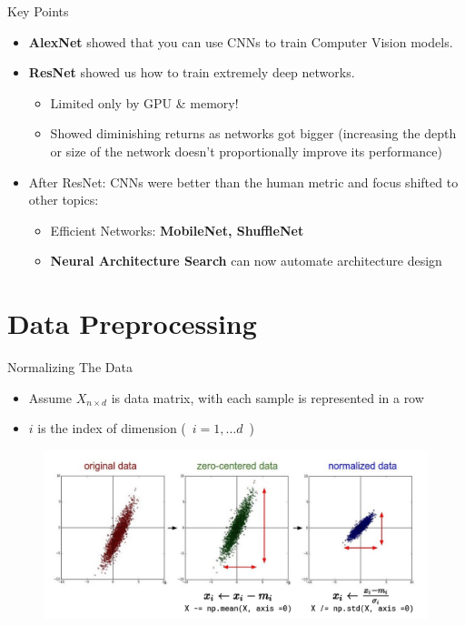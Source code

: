 \documentclass[serif, aspectratio=169]{beamer}
\begin{document}
\begin{frame}{Key Points}
	\begin{itemize}
		\item \textbf{AlexNet} showed that you can use CNNs to train Computer Vision models. 
		\item \textbf{ResNet} showed us how to train extremely deep networks.
		\begin{itemize}
			\item Limited only by GPU \& memory!
			\item Showed diminishing returns as networks got bigger (increasing the depth or size of the network doesn't proportionally improve its performance)
		\end{itemize}
		\item After ResNet: CNNs were better than the human metric and focus shifted to other topics:
		\begin{itemize}
			\item Efficient Networks: \textbf{MobileNet, ShuffleNet}
			\item \textbf{Neural Architecture Search} can now automate architecture design
		\end{itemize}
	\end{itemize}
\end{frame}

\section{Data Preprocessing}

\begin{frame}{Normalizing The Data}
	\begin{itemize}
		\item Assume $X_{n \times d}$ is data matrix, with each sample  is represented in a row
		\item $i$ is the index of dimension (\ $i = 1, \dots d$\ )
	\end{itemize}
	\begin{figure}[htpb]
		\begin{center}
			\includegraphics[keepaspectratio, scale=0.3]{pic/normaliz}
		\end{center}
	\end{figure}
\end{frame}
\end{document}
